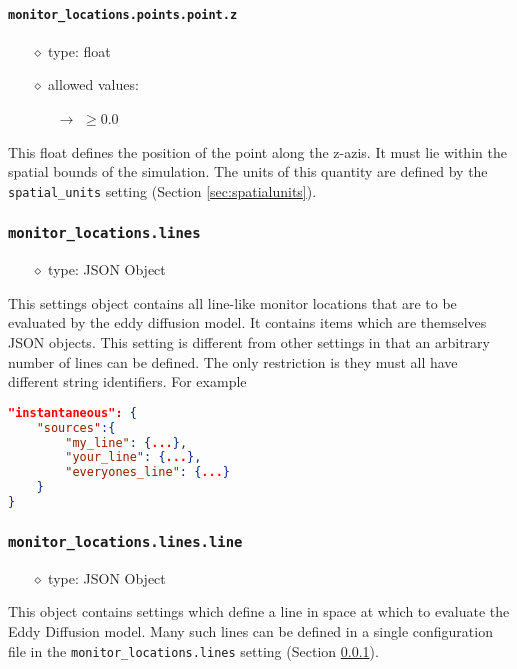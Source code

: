 \documentclass[]{article}
\def\code#1{\texttt{#1}}
\begin{document}
\paragraph{\code{monitor\_locations.points.point.z}}
\begin{itemize}
    \item[$\diamond$] type: float 
    \item[$\diamond$] allowed values:
    \begin{itemize}
        \item[$\rightarrow$] $\geq0.0$
    \end{itemize}
\end{itemize}
This float defines the position of the point along the z-azis. It must lie
within the spatial bounds of the simulation. The units of this quantity are
defined by the \code{spatial\_units} setting (Section \ref{sec:spatialunits}).

\subsubsection{\code{monitor\_locations.lines}}\label{sec:monlines}
\begin{itemize}
    \item[$\diamond$] type: JSON Object 
\end{itemize}
This settings object contains all line-like monitor locations that are to be
evaluated by the eddy diffusion model. It contains items which
are themselves JSON objects. This setting is different from other settings in
that an arbitrary number of lines can be defined. The only restriction is they
must all have different string identifiers. For example\\
\begin{lstlisting}[language=json,firstnumber=1]
"instantaneous": {
    "sources":{
        "my_line": {...},
        "your_line": {...},
        "everyones_line": {...}
    }
}
\end{lstlisting}

\subsubsection{\code{monitor\_locations.lines.line}}
\begin{itemize}
    \item[$\diamond$] type: JSON Object 
\end{itemize}
This object contains settings which define a line in space at which to evaluate
the Eddy Diffusion model. Many such lines can be defined in a single
configuration file in the \code{monitor\_locations.lines} setting (Section
\ref{sec:monlines}).
\end{document}
